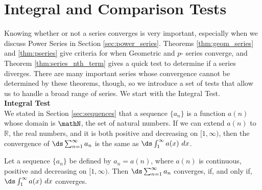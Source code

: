 \section{Integral and Comparison Tests}\label{sec:int_comp_tests}

Knowing whether or not a series converges is very important, especially when we discuss Power Series in Section \ref{sec:power_series}. Theorems \ref{thm:geom_series} and \ref{thm:pseries} give criteria for when Geometric and $p$- series converge, and Theorem \ref{thm:series_nth_term} gives a quick test to determine if a series diverges. There are many important series whose convergence cannot be determined by these theorems, though, so we introduce a set of tests that allow us to handle a broad range of series. We start with the Integral Test.\\


\noindent\textbf{\large Integral Test}\\

We stated in Section \ref{sec:sequences} that a sequence $\{a_n\}$ is a function $a(n)$ whose domain is $\mathN$, the set of natural numbers. If we can extend $a(n)$ to $\mathbb{R}$, the real numbers, and it is both positive and decreasing on $[1,\infty)$, then the convergence of $\ds \sum_{n=1}^\infty a_n$ is the same as $\ds\int_1^\infty a(x)\ dx$. 

{Let a sequence $\{a_n\}$ be defined by $a_n=a(n)$, where $a(n)$ is continuous, positive and decreasing on $[1,\infty)$. Then $\ds \sum_{n=1}^\infty a_n$ converges, if, and only if, $\ds\int_1^\infty a(x)\ dx$ converges.
}

